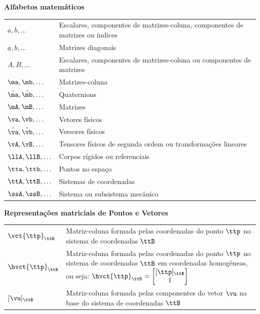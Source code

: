 \documentclass[]{politex}
\begin{document}
\begin{center} \begin{Large} \textbf{Alfabetos matemáticos} \end{Large} \end{center}
\begin{longtable}{lp{}}
  $a, b, \hdots $ & Escalares, componentes de matrizes-coluna, componentes de matrizes ou índices \\
  $\underline{a}, \underline{b}, \hdots $ & Matrizes diagonais \\
  $A, B, \hdots$ & Escalares, componentes de matrizes-coluna ou componentes de matrizes \\
  $\ma, \mb, \hdots$ & Matrizes-coluna \\
  $\breve{\ma}, \breve{\mb}, \hdots$ & Quaternions \\
  $\mA, \mB, \hdots$ & Matrizes \\
  $\va, \vb, \hdots$ & Vetores físicos \\
  $\hat{\va}, \hat{\vb}, \hdots$ & Versores físicos \\
  $\vA, \vB, \hdots$ & Tensores físicos de segunda ordem ou transformações lineares \\
  $\llA, \llB, \hdots$ & Corpos rígidos ou referenciais \\
  $\tta, \ttb, \hdots$ & Pontos no espaço \\
  $\ttA, \ttB, \hdots$ & Sistemas de coordenadas \\
  $\ssA, \ssB, \hdots$ & Sistema ou subsistema mecânico \\
\end{longtable}
\begin{center} \begin{Large} \textbf{Representações matriciais de Pontos e Vetores} \end{Large} \end{center}
\begin{longtable}{lp{}}
  $\vct{\ttp}_{\ttB}$ & Matriz-coluna formada pelas coordenadas do ponto $\ttp$ no sistema de coordenadas $\ttB$ \\
  $\hvct{\ttp}_{\ttB}$ & Matriz-coluna formada pelas coordenadas do ponto $\ttp$ no sistema de coordenadas $\ttB$ em coordenadas homog\^eneas, ou seja: $\hvct{\ttp}_{\ttB} = \begin{bmatrix}
[\ttp]_{\ttB} \\
1
\end{bmatrix} $ \\
  $[\vu]_{\ttB}$ & Matriz-coluna formada pelas componentes do vetor $\vu$ na base do sistema de coordenadas $\ttB$ \\
\end{longtable}
\end{document}

